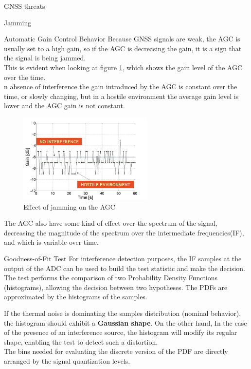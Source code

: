 \begin{section}{GNSS threats}
\begin{subsection}{Jamming}
\begin{subsubsection}{Automatic Gain Control Behavior}
        Because GNSS signals are weak, the AGC is usually set to a high gain, so if the AGC is
        decreasing the gain, it is a sign that the signal is being jammed.\\
        This is evident when looking at figure \ref{fig:AGC jamming}, which shows the gain level
        of the AGC over the time.\\
        n absence of interference the gain introduced by the AGC is constant over the time, or slowly
        changing, but in a hostile environment the average gain level is lower and the AGC
        gain is not constant.
        \begin{figure}[h]
          \centering
          \includegraphics[width=0.6\textwidth]{img/wireless/AGC jamming.png}
          \caption{Effect of jamming on the AGC}
          \label{fig:AGC jamming}
        \end{figure}
        The AGC also have some kind of effect over the spectrum of the signal, decreasing the magnitude 
        of the spectrum over the intermediate frequencies(IF), and which is variable over time.\\
        

        \end{subsubsection}
        \begin{subsubsection}{Goodness-of-Fit Test}
          For interference detection purposes, the IF samples at the output of the ADC can be used 
          to build the test statistic and make the decision.\\
          The test performs the comparison of two Probability Density Functions (histograms),
          allowing the decision between two hypotheses. The PDFs are approximated by the histograms of
          the samples.
          
          If the thermal noise is dominating the samples distribution (nominal behavior), the 
          histogram should exhibit a \textbf{Gaussian shape}.
          On the other hand, In the case of the presence of an interference source, the histogram 
          will modify its regular shape, enabling the test to detect such a distortion.\\
          The bins needed for evaluating the discrete version of the PDF are directly arranged by 
          the signal quantization levels.


\end{subsubsection}
\end{subsection}
\end{section}
